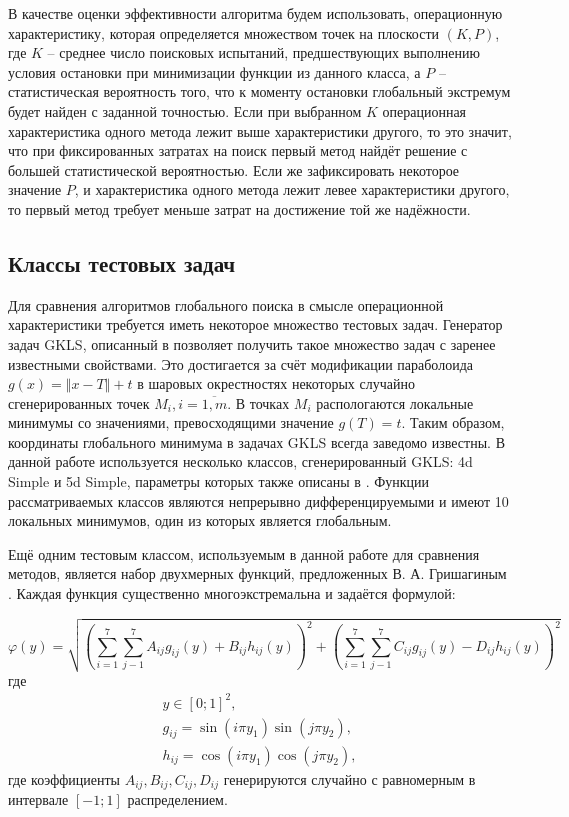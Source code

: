 В качестве оценки эффективности алгоритма будем использовать, операционную характеристику,
которая определяется множеством точек на плоскости \((K, P)\),
где \(K\) – среднее число поисковых испытаний, предшествующих выполнению условия
остановки при минимизации функции из данного класса, а \(P\) – статистическая вероятность того,
что к моменту остановки глобальный экстремум будет найден с заданной точностью.
Если при выбранном \(K\) операционная характеристика одного метода лежит выше характеристики другого,
то это значит, что при фиксированных затратах на поиск первый метод найдёт решение с
большей статистической вероятностью. Если же зафиксировать некоторое значение \(P\), и
характеристика одного метода лежит левее характеристики другого, то первый метод
требует меньше затрат на достижение той же надёжности.

\subsection{Классы тестовых задач} \label{subsec:test_problems}
Для сравнения алгоритмов глобального поиска в смысле операционной характеристики
требуется иметь некоторое множество тестовых задач. Генератор задач GKLS, описанный в
\cite{gklsBook} позволяет получить такое множество задач с заренее известными свойствами.
Это достигается за счёт модификации параболоида \(g(x)=\Vert x-T\Vert + t\) в
шаровых окрестностях некоторых случайно сгенерированных точек \(M_i, i=\overline{1,m}\). В точках
\(M_i\) распологаются локальные минимумы со значениями, превосходящими значение
\(g(T)=t\). Таким образом, координаты глобального минимума в задачах GKLS всегда заведомо известны.
В данной работе используется несколько классов, сгенерированный GKLS: 4d Simple и 5d Simple,
параметры которых также описаны в \cite{gklsBook}. Функции рассматриваемых
классов являются непрерывно дифференцируемыми и имеют 10 локальных минимумов, один из которых является глобальным.

Ещё одним тестовым классом, используемым в данной работе для сравнения методов,
является набор двухмерных функций, предложенных В. А. Гришагиным \cite{grishaginClass}.
Каждая функция существенно многоэкстремальна и задаётся формулой:

\begin{displaymath}
  \varphi(y)=\sqrt{\left(\sum_{i=1}^7\sum_{j-1}^7 A_{ij}g_{ij}(y)+ B_{ij}h_{ij}(y)\right)^2+\left(\sum_{i=1}^7\sum_{j-1}^7 C_{ij}g_{ij}(y) - D_{ij}h_{ij}(y)\right)^2}
\end{displaymath}
где
\begin{displaymath}
  \begin{array}{cr}
    y\in[0;1]^2, \\
    g_{ij}=\sin(i\pi y_1)\sin(j\pi y_2), \\
    h_{ij}=\cos(i\pi y_1)\cos(j\pi y_2),
  \end{array}
\end{displaymath}
где коэффициенты \(A_{ij},B_{ij}, C_{ij}, D_{ij}\) генерируются случайно с равномерным в
интервале \([-1;1]\) распределением.
